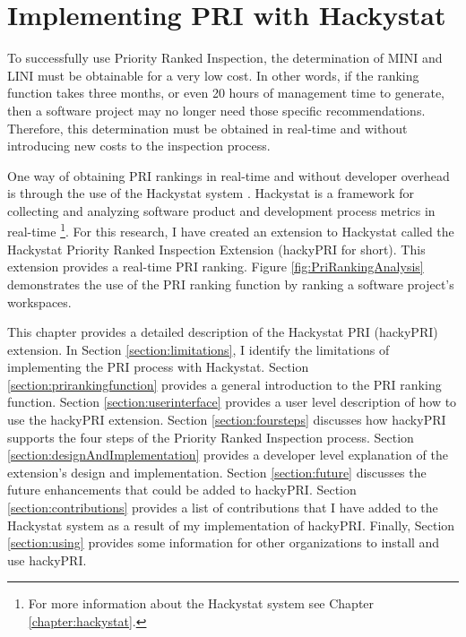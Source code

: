 
\chapter{Implementing PRI with Hackystat}
\label{chapter:system}
To successfully use Priority Ranked Inspection, the determination of MINI
and LINI must be obtainable for a very low cost. In other words, if the
ranking function takes three months, or even 20 hours of management time to
generate, then a software project may no longer need those specific
recommendations. Therefore, this determination must be obtained in
real-time and without introducing new costs to the inspection process.

One way of obtaining PRI rankings in real-time and without developer
overhead is through the use of the Hackystat system \cite{Johnson05}.
Hackystat is a framework for collecting and analyzing software product and
development process metrics in real-time \footnote{For more information
  about the Hackystat system see Chapter \ref{chapter:hackystat}.}. For
this research, I have created an extension to Hackystat called the
Hackystat Priority Ranked Inspection Extension (hackyPRI for short). This
extension provides a real-time PRI ranking. Figure
\ref{fig:PriRankingAnalysis} demonstrates the use of the PRI ranking
function by ranking a software project's workspaces.

This chapter provides a detailed description of the Hackystat PRI
(hackyPRI) extension. In Section \ref{section:limitations}, I identify the
limitations of implementing the PRI process with Hackystat. Section
\ref{section:prirankingfunction} provides a general introduction to the PRI
ranking function. Section \ref{section:userinterface} provides a user level
description of how to use the hackyPRI extension. Section
\ref{section:foursteps} discusses how hackyPRI supports the four steps of
the Priority Ranked Inspection process. Section
\ref{section:designAndImplementation} provides a developer level
explanation of the extension's design and implementation. Section
\ref{section:future} discusses the future enhancements that could be added
to hackyPRI. Section \ref{section:contributions} provides a list of
contributions that I have added to the Hackystat system as a result of my
implementation of hackyPRI. Finally, Section \ref{section:using} provides
some information for other organizations to install and use hackyPRI.


